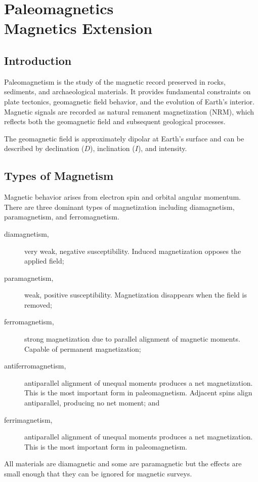 \chapter{Paleomagnetics\\ \large Magnetics Extension}\label{ch:paleomag}

\section{Introduction}

Paleomagnetism is the study of the magnetic record preserved in rocks, sediments, and archaeological materials. It provides fundamental constraints on plate tectonics, geomagnetic field behavior, and the evolution of Earth's interior. Magnetic signals are recorded as natural remanent magnetization (NRM), which reflects both the geomagnetic field and subsequent geological processes.

The geomagnetic field is approximately dipolar at Earth's surface and can be described by declination ($D$), inclination ($I$), and intensity.

\section{Types of Magnetism}
Magnetic behavior arises from electron spin and orbital angular momentum.  There are three dominant types of magnetization including diamagnetism, paramagnetism, and ferromagnetism. 
\begin{description}
    \item[diamagnetism,] very weak, negative susceptibility. Induced magnetization opposes the applied field;
    \item[paramagnetism,] weak, positive susceptibility. Magnetization disappears when the field is removed;
    \item[ferromagnetism,] strong magnetization due to parallel alignment of magnetic moments. Capable of permanent magnetization; 
    \item[antiferromagnetism,] antiparallel alignment of unequal moments produces a net magnetization. This is the most important form in paleomagnetism. Adjacent spins align antiparallel, producing no net moment; and
    \item[ferrimagnetism,] antiparallel alignment of unequal moments produces a net magnetization. This is the most important form in paleomagnetism.
\end{description}
All materials are diamagnetic and some are paramagnetic but the effects are small enough that they can be ignored for magnetic surveys.

